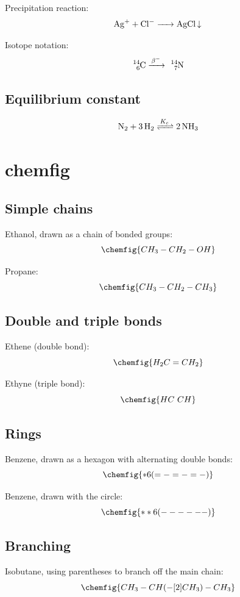 Precipitation reaction:
\[
	\ce{Ag+ + Cl- -> AgCl v}
\]

Isotope notation:
\[
	\ce{^{14}_6C ->[\beta^-] \, ^{14}_7N}
\]

\subsection{Equilibrium constant}

\[
	\ce{N2 + 3H2 <=>[$K_c$] 2NH3}
\]

\section{chemfig}

\subsection{Simple chains}

Ethanol, drawn as a chain of bonded groups:
\[
	\chemfig{CH_3-CH_2-OH}
\]

Propane:
\[
	\chemfig{CH_3-CH_2-CH_3}
\]

\subsection{Double and triple bonds}

Ethene (double bond):
\[
	\chemfig{H_2C=CH_2}
\]

Ethyne (triple bond):
\[
	\chemfig{HC~CH}
\]

\subsection{Rings}

Benzene, drawn as a hexagon with alternating double bonds:
\[
	\chemfig{*6(=-=-=-)}
\]

Benzene, drawn with the circle:
\[
	\chemfig{**6(------)}
\]

\subsection{Branching}

Isobutane, using parentheses to branch off the main chain:
\[
	\chemfig{CH_3-CH(-[2]CH_3)-CH_3}
\]

